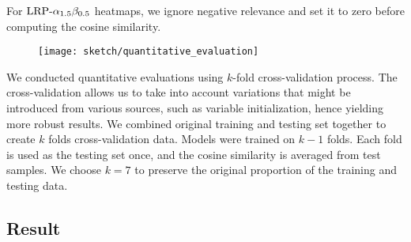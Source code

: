 For $\text{LRP-}\alpha_{1.5}\beta_{0.5}$ heatmaps, we ignore negative relevance and set it to zero before computing the cosine similarity.

\begin{figure}[!htb]
\centering
\texttt{[image: sketch/quantitative\_evaluation]}
\label{fig:quantitative_evaluation}
\end{figure}

We conducted quantitative evaluations using $k$-fold cross-validation process. The cross-validation allows us to take into account variations that might be introduced from various sources, such as variable initialization, hence yielding more robust results. We combined original training and testing set together to create $k$ folds cross-validation data. Models were trained on $k-1$ folds. Each fold is used as the testing set once, and the cosine similarity is averaged from test samples.  We choose $k=7$ to preserve the original proportion of the training and testing data.








\subsection{Result}

